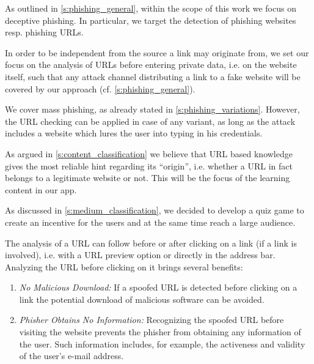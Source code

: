 \begin{description}[leftmargin=0cm]
	\item[Deceptive Phishing as Phishing Technique:] As outlined in \autoref{s:phishing_general}, within the scope of this work we focus on deceptive phishing.
 In particular, we target the detection of phishing websites resp. phishing URLs.

	\item[Several Attack Channels:] In order to be independent from the source a link may originate from, we set our focus on the analysis of URLs before entering private data, i.e. on the website itself, such that any attack channel distributing a link to a fake website will be covered by our approach (cf. \autoref{s:phishing_general}).

	\item[Mass Phishing as Variation of Phishing:] We cover mass phishing, as already stated in \autoref{s:phishing_variations}.
 However, the URL checking can be applied in case of any variant, as long as the attack includes a website which lures the user into typing in his credentials.

	\item[URL Based Knowledge as Learning Content:] As argued in \autoref{s:content_classification} we believe that URL based knowledge gives the most reliable hint regarding its ``origin'', i.e. whether a URL in fact belongs to a legitimate website or not. This will be the focus of the learning content in our app.

	\item[Game and Quiz Based Learning as Communication Medium:] As discussed in \autoref{s:medium_classification}, we decided to develop a quiz game to create an incentive for the users and at the same time reach a large audience. 

	\item[After Click URL Analysis:] The analysis of a URL can follow before or after clicking on a link (if a link is involved), i.e. with a URL preview option or directly in the address bar. 
Analyzing the URL before clicking on it brings several benefits:

\begin{enumerate}
	\item \textit{No Malicious Download:} If a spoofed URL is detected before clicking on a link the potential download of  malicious software can be avoided. 
	\item \textit{Phisher Obtains No Information:} Recognizing the spoofed URL before visiting the website prevents the phisher from obtaining any information of the user. Such information includes, for example, the activeness and validity of the user's e-mail address. 
\end{enumerate}


\end{description}
